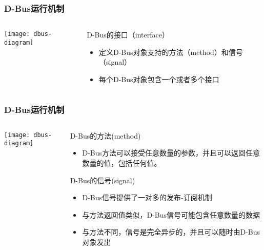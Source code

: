 \begin{frame}[fragile]
	\frametitle{D-Bus运行机制}
	
	\begin{columns}
		\begin{column}{.4\textwidth}
			
			\texttt{[image: dbus-diagram]}
			
		\end{column}
		\begin{column}{.6\textwidth}
			D-Bus的接口（interface）
			\begin{itemize}
				\item 定义D-Bus对象支持的方法（method）和信号（signal）
				\item 每个D-Bus对象包含一个或者多个接口				
			\end{itemize}
		\end{column}
	\end{columns}
\end{frame}

\begin{frame}[fragile]
	\frametitle{D-Bus运行机制}
	
	\begin{columns}
		\begin{column}{.4\textwidth}
			
			\texttt{[image: dbus-diagram]}
			
		\end{column}
		\begin{column}{.6\textwidth}
			D-Bus的方法(method)
			\begin{itemize}
				\item D-Bus方法可以接受任意数量的参数，并且可以返回任意数量的值，包括任何值。				
			\end{itemize}
			D-Bus的信号(signal)
			\begin{itemize}
				\item D-Bus信号提供了一对多的发布-订阅机制
				\item 与方法返回值类似，D-Bus信号可能包含任意数量的数据
				\item 与方法不同，信号是完全异步的，并且可以随时由D-Bus对象发出 			
			\end{itemize}		
		\end{column}
	\end{columns}
\end{frame}

